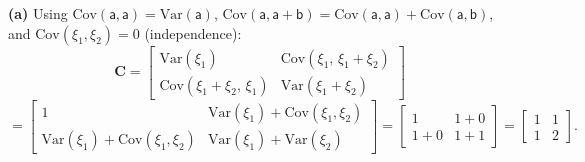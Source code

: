 \begin{solution}
    \textbf{(a)} Using $\mathrm{Cov}(\mathsf{a}, \mathsf{a}) = \mathrm{Var}(\mathsf{a})$, $\mathrm{Cov}(\mathsf{a}, \mathsf{a} + \mathsf{b}) = \mathrm{Cov}(\mathsf{a}, \mathsf{a}) + \mathrm{Cov}(\mathsf{a}, \mathsf{b})$, and $\mathrm{Cov}(\xi_{1}, \xi_{2}) = 0$ (independence):
    \[
        \mathbf{C}
        = \begin{bmatrix}
            \mathrm{Var}(\xi_{1}) &
                \mathrm{Cov}(\xi_{1},\, \xi_{1}+\xi_{2}) \\
            \mathrm{Cov}(\xi_{1}+\xi_{2},\, \xi_{1}) &
                \mathrm{Var}(\xi_{1}+\xi_{2})
          \end{bmatrix}
    \]
    \[
        = \begin{bmatrix}
            1 &
                \mathrm{Var}(\xi_{1}) + \mathrm{Cov}(\xi_{1}, \xi_{2}) \\
            \mathrm{Var}(\xi_{1}) + \mathrm{Cov}(\xi_{1}, \xi_{2}) &
                \mathrm{Var}(\xi_{1}) + \mathrm{Var}(\xi_{2})
          \end{bmatrix}
        = \begin{bmatrix} 1 & 1+0 \\ 1+0 & 1+1 \end{bmatrix}
        = \begin{bmatrix} 1 & 1 \\ 1 & 2 \end{bmatrix}.
    \]


\end{solution}

